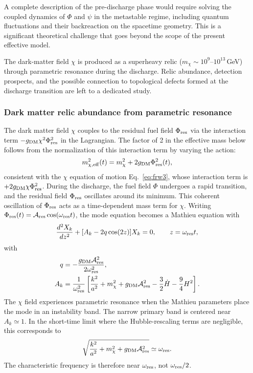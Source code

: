 \documentclass[epj]{svjour}
\begin{document}
\begin{description}
A complete description of the pre-discharge phase would require
solving the coupled dynamics of $\Phi$ and $\psi$ in the
metastable regime, including quantum fluctuations and their
backreaction on the spacetime geometry. This is a significant
theoretical challenge that goes beyond the scope of the present
effective model.

\item[Dark matter phenomenology.] 
The dark-matter field $\chi$ is produced as a superheavy relic
($m_\chi\sim10^{9}$--$10^{13}\,$GeV) through parametric resonance
during the discharge. Relic abundance, detection prospects, and the
possible connection to topological defects formed at the discharge
transition are left to a dedicated study.

\subsubsection{Dark matter relic abundance from parametric resonance}
\label{sec:dm_relic}

The dark matter field $\chi$ couples to the residual fuel field
$\Phi_{\rm res}$ via the interaction term
$-g_{\rm DM}\chi^2\Phi_{\rm res}^2$ in the Lagrangian. The factor of
2 in the effective mass below follows from the normalization of this
interaction term by varying the action:
\begin{equation}
m_{\chi,\rm eff}^2(t) = m_\chi^2 + 2g_{\rm DM}\Phi_{\rm res}^2(t),
\end{equation}
consistent with the $\chi$ equation of motion
Eq.~\eqref{eq:frw3}, whose interaction term is
$+2g_{\rm DM}\chi\Phi_{\rm res}^2$. During the
discharge, the fuel field $\Phi$ undergoes a rapid transition, and
the residual field $\Phi_{\rm res}$ oscillates around its minimum.
This coherent oscillation of $\Phi_{\rm res}$ acts as a time-dependent
mass term for $\chi$. Writing
$\Phi_{\rm res}(t)=\mathcal{A}_{\rm res}\cos(\omega_{\rm res}t)$,
the mode equation becomes a Mathieu equation with
\begin{equation}
\frac{d^2X_k}{dz^2}+[A_k-2q\cos(2z)]X_k=0,
\qquad z=\omega_{\rm res}t,
\end{equation}
with
\begin{align}
q&=-\frac{g_{\rm DM}\mathcal{A}_{\rm res}^2}
{2\omega_{\rm res}^2},\nonumber\\
A_k&=\frac{1}{\omega_{\rm res}^2}
\left[
\frac{k^2}{a^2}+m_\chi^2+g_{\rm DM}\mathcal{A}_{\rm res}^2
-\frac{3}{2}\dot H-\frac{9}{4}H^2
\right].
\end{align}
The $\chi$ field experiences parametric resonance when the Mathieu
parameters place the mode in an instability band. The narrow primary
band is centered near $A_k\simeq1$. In the short-time limit where the
Hubble-rescaling terms are negligible, this corresponds to
\begin{equation}
\sqrt{\frac{k^2}{a^2}+m_\chi^2+
g_{\rm DM}\mathcal A_{\rm res}^2}
\simeq\omega_{\rm res}.
\end{equation}
The characteristic frequency is therefore near $\omega_{\rm res}$,
not $\omega_{\rm res}/2$.


\end{description}
\end{document}
